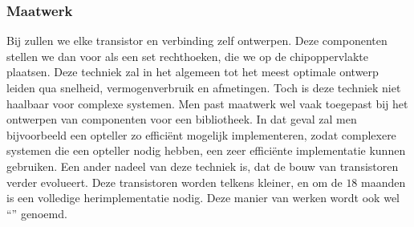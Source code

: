 \subsubsection{Maatwerk}
Bij  zullen we elke transistor en verbinding zelf ontwerpen. Deze componenten stellen we dan voor als een set rechthoeken, die we op de chipoppervlakte plaatsen. Deze techniek zal in het algemeen tot het meest optimale ontwerp leiden qua snelheid, vermogenverbruik en afmetingen. Toch is deze techniek niet haalbaar voor complexe systemen. Men past maatwerk wel vaak toegepast bij het ontwerpen van componenten voor een bibliotheek. In dat geval zal men bijvoorbeeld een opteller zo effici\"ent mogelijk implementeren, zodat complexere systemen die een opteller nodig hebben, een zeer effici\"ente implementatie kunnen gebruiken. Een ander nadeel van deze techniek is, dat de bouw van transistoren verder evolueert. Deze transistoren worden telkens kleiner, en om de $18$ maanden is een volledige herimplementatie nodig. Deze manier van werken wordt ook wel ``'' genoemd.

